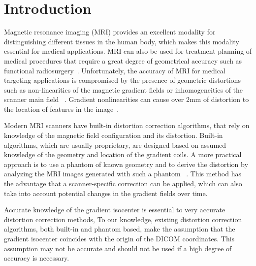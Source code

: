 \section{Introduction}
\label{Introduction}

Magnetic resonance imaging (MRI) provides an excellent modality for distinguishing different tissues in the human body, which makes this modality essential for medical applications. MRI can also be used for treatment planning of medical procedures that require a great degree of geometrical accuracy such as  functional radiosurgery~\cite{Kond99}. Unfortunately, the accuracy of MRI for medical targeting applications is compromised by the presence of geometric distortions such as non-linearities of the magnetic gradient fields or inhomogeneities of the scanner main field ~\cite{Dor05,LSS06a,LSS06b,LSS08a,tlee_iaeng,simple_approach,Wang04a,Wang04b}. Gradient nonlinearities can cause over 2mm of distortion to the location of features in the image~\cite{tlee_iaeng,simple_approach}.

Modern MRI scanners have built-in distortion correction algorithms, that rely on knowledge of the magnetic field configuration and its distortion. Built-in algorithms, which are usually proprietary, are designed based on assumed knowledge of the geometry and location of the gradient coils. A more practical approach is to use a phantom of known geometry and to derive the distortion by analyzing the MRI images generated with such a phantom ~\cite{Dor05,LSS06a,LSS06b,LSS08a,tlee_iaeng,simple_approach,Wang04a,Wang04b}. This method has the advantage that a scanner-specific correction can be applied, which can also take into account potential changes in the gradient fields over time.

Accurate knowledge of the gradient isocenter is essential to very accurate distortion correction methods, To our knowledge, existing distortion correction algorithms, both built-in and phantom based, make the assumption that the gradient isocenter coincides with the origin of the DICOM coordinates. This assumption may not be accurate and should not be used if a high degree of accuracy is necessary.

